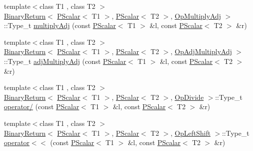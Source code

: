 \begin{DoxyCompactItemize}
{\footnotesize template$<$class T1 , class T2 $>$ }\\\mbox{\hyperlink{structENSEM_1_1BinaryReturn}{Binary\+Return}}$<$ \mbox{\hyperlink{classENSEM_1_1PScalar}{P\+Scalar}}$<$ T1 $>$, \mbox{\hyperlink{classENSEM_1_1PScalar}{P\+Scalar}}$<$ T2 $>$, \mbox{\hyperlink{structENSEM_1_1OpMultiplyAdj}{Op\+Multiply\+Adj}} $>$\+::Type\+\_\+t \mbox{\hyperlink{group__primscalar_gabacc9ee173ff2dff79b3faed5f551bfd}{multiply\+Adj}} (const \mbox{\hyperlink{classENSEM_1_1PScalar}{P\+Scalar}}$<$ T1 $>$ \&l, const \mbox{\hyperlink{classENSEM_1_1PScalar}{P\+Scalar}}$<$ T2 $>$ \&r)
\item 
{\footnotesize template$<$class T1 , class T2 $>$ }\\\mbox{\hyperlink{structENSEM_1_1BinaryReturn}{Binary\+Return}}$<$ \mbox{\hyperlink{classENSEM_1_1PScalar}{P\+Scalar}}$<$ T1 $>$, \mbox{\hyperlink{classENSEM_1_1PScalar}{P\+Scalar}}$<$ T2 $>$, \mbox{\hyperlink{structENSEM_1_1OpAdjMultiplyAdj}{Op\+Adj\+Multiply\+Adj}} $>$\+::Type\+\_\+t \mbox{\hyperlink{group__primscalar_gaefec03134414f1f7c36b09b92cf9570b}{adj\+Multiply\+Adj}} (const \mbox{\hyperlink{classENSEM_1_1PScalar}{P\+Scalar}}$<$ T1 $>$ \&l, const \mbox{\hyperlink{classENSEM_1_1PScalar}{P\+Scalar}}$<$ T2 $>$ \&r)
\item 
{\footnotesize template$<$class T1 , class T2 $>$ }\\\mbox{\hyperlink{structENSEM_1_1BinaryReturn}{Binary\+Return}}$<$ \mbox{\hyperlink{classENSEM_1_1PScalar}{P\+Scalar}}$<$ T1 $>$, \mbox{\hyperlink{classENSEM_1_1PScalar}{P\+Scalar}}$<$ T2 $>$, \mbox{\hyperlink{structENSEM_1_1OpDivide}{Op\+Divide}} $>$\+::Type\+\_\+t \mbox{\hyperlink{group__primscalar_ga45ba7920db563ad713c3977adc283ede}{operator/}} (const \mbox{\hyperlink{classENSEM_1_1PScalar}{P\+Scalar}}$<$ T1 $>$ \&l, const \mbox{\hyperlink{classENSEM_1_1PScalar}{P\+Scalar}}$<$ T2 $>$ \&r)
\item 
{\footnotesize template$<$class T1 , class T2 $>$ }\\\mbox{\hyperlink{structENSEM_1_1BinaryReturn}{Binary\+Return}}$<$ \mbox{\hyperlink{classENSEM_1_1PScalar}{P\+Scalar}}$<$ T1 $>$, \mbox{\hyperlink{classENSEM_1_1PScalar}{P\+Scalar}}$<$ T2 $>$, \mbox{\hyperlink{structENSEM_1_1OpLeftShift}{Op\+Left\+Shift}} $>$\+::Type\+\_\+t \mbox{\hyperlink{group__primscalar_ga39d346ef6c678a5a37348a5a403e955d}{operator$<$$<$}} (const \mbox{\hyperlink{classENSEM_1_1PScalar}{P\+Scalar}}$<$ T1 $>$ \&l, const \mbox{\hyperlink{classENSEM_1_1PScalar}{P\+Scalar}}$<$ T2 $>$ \&r)
\item 

\end{DoxyCompactItemize}
